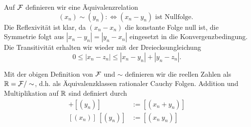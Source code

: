 Auf \({\cal F}\) definieren wir eine Äquivalenzrelation
\begin{equation*}
 (x_n) \sim (y_n) : \Leftrightarrow (x_n-y_n) \text{ ist Nullfolge. }
\end{equation*}
Die Reflexivität ist klar, da \((x_n-x_n)\) die konstante Folge null ist, die Symmetrie folgt aus \(|x_n-y_n|=|y_n-x_n|\) eingesetzt in die Konvergenzbedingung. Die Transitivität erhalten wir wieder mit der Dreiecksungleichung
\begin{equation*}
 0 \leq  |x_n - z_n| \leq |x_n-y_n| + |y_n - z_n|.
\end{equation*}\label{grundlagen/zahlensysteme:definition-18}
\begin{definition}{}{}



Mit der obigen Definition von \({\cal F}\) und \(\sim\) definieren wir die reellen Zahlen als \(\mathbb{R} = {\cal F}/\sim\), d.h. als Äquivalenzklassen rationaler Cauchy Folgen.
Addition und Multiplikation auf \(\mathbb{R}\) sind definiert durch
\begin{align*}
[(x_n)] + [(y_n)] &:= [(x_n+y_n)] \\
[(x_n)] ~ [(y_n)] &:= [(x_n~y_n)]\end{align*}\end{definition}

